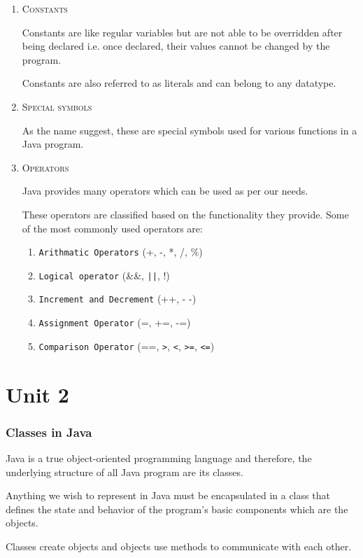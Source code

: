 \documentclass[a4paper, 12pt]{scrarticle}
\begin{document}
\begin{enumerate}
  \item \textsc{Constants}

    Constants are like regular variables but are not able to be overridden after being declared i.e. once declared, their values cannot be changed by the program.

    Constants are also referred to as literals and can belong to any datatype.

  \item \textsc{Special symbols}

    As the name suggest, these are special symbols used for various functions in a Java program.

  \item \textsc{Operators}

    Java provides many operators which can be used as per our needs.

    These operators are classified based on the functionality they provide. Some of the most commonly used operators are:
    \begin{enumerate}
      \item \texttt{Arithmatic Operators} (+, -, *, /, \%)
      \item \texttt{Logical operator} (\&\&, \verb+||+, !)
      \item \texttt{Increment and Decrement} (++,  - -)
      \item \texttt{Assignment Operator} (=, +=, -=)
      \item \texttt{Comparison Operator} (==, \verb+>+, \verb+<+, \verb+>=+, \verb+<=+)
    \end{enumerate}
\end{enumerate}

\newpage
\part{Unit 2}
\section{Classes in Java}
Java is a true object-oriented programming language and therefore, the underlying structure of all Java program are its classes.

Anything we wish to represent in Java must be encapsulated in a class that defines the state and behavior of the program's basic components which are the objects.

Classes create objects and objects use methods to communicate with each other.
\end{document}

